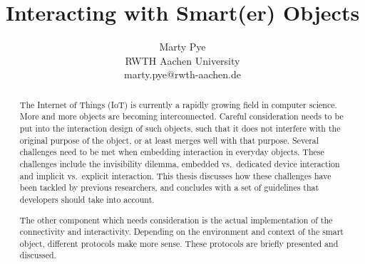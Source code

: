 \documentclass{acm_proc_article-sp}
\begin{document}
\title{Interacting with Smart(er) Objects}
\author{Marty Pye\\ RWTH Aachen University\\ marty.pye@rwth-aachen.de}
\maketitle
\begin{abstract}
The Internet of Things (IoT) is currently a rapidly growing field in computer science. More and more objects are becoming interconnected.
Careful consideration needs to be put into the interaction design of such objects, such that it does not interfere with the original purpose of the object, or at least merges well with that purpose.
Several challenges need to be met when embedding interaction in everyday objects.
These challenges include the invisibility dilemma, embedded vs.\ dedicated device interaction and implicit vs.\ explicit interaction.
This thesis discusses how these challenges have been tackled by previous researchers, and concludes with a set of guidelines that developers should take into account.

The other component which needs consideration is the actual implementation of the connectivity and interactivity. Depending on the environment and context of the smart object, different protocols make more sense. These protocols are briefly presented and discussed.
\end{abstract}
\end{document}
